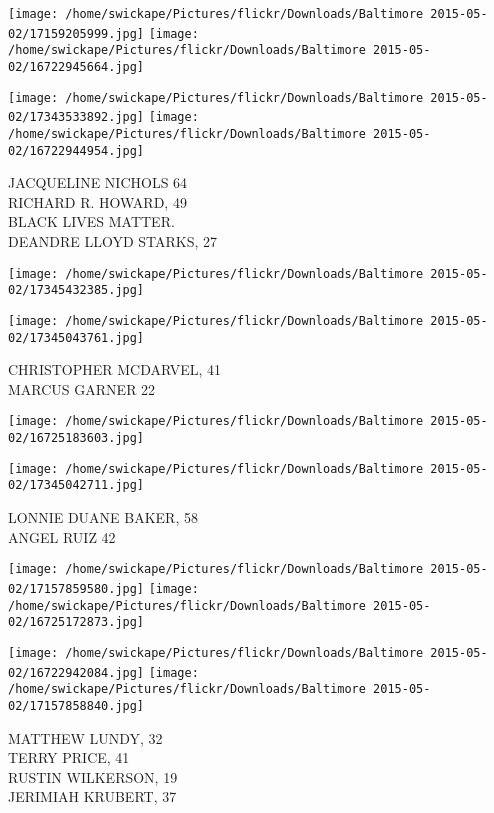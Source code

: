 \documentclass[10pt,letterpaper]{article}
\begin{document}
\texttt{[image: /home/swickape/Pictures/flickr/Downloads/Baltimore 2015-05-02/17159205999.jpg]}
\texttt{[image: /home/swickape/Pictures/flickr/Downloads/Baltimore 2015-05-02/16722945664.jpg]}

\texttt{[image: /home/swickape/Pictures/flickr/Downloads/Baltimore 2015-05-02/17343533892.jpg]}
\texttt{[image: /home/swickape/Pictures/flickr/Downloads/Baltimore 2015-05-02/16722944954.jpg]}

JACQUELINE NICHOLS 64\\
RICHARD R. HOWARD, 49\\
BLACK LIVES MATTER.\\
DEANDRE LLOYD STARKS, 27\\
\pagebreak

\texttt{[image: /home/swickape/Pictures/flickr/Downloads/Baltimore 2015-05-02/17345432385.jpg]}

\vspace{0.25in}
\texttt{[image: /home/swickape/Pictures/flickr/Downloads/Baltimore 2015-05-02/17345043761.jpg]}

CHRISTOPHER MCDARVEL, 41\\
MARCUS GARNER 22\\
\pagebreak

\texttt{[image: /home/swickape/Pictures/flickr/Downloads/Baltimore 2015-05-02/16725183603.jpg]}

\vspace{0.25in}
\texttt{[image: /home/swickape/Pictures/flickr/Downloads/Baltimore 2015-05-02/17345042711.jpg]}

LONNIE DUANE BAKER, 58\\
ANGEL RUIZ 42\\
\pagebreak

\texttt{[image: /home/swickape/Pictures/flickr/Downloads/Baltimore 2015-05-02/17157859580.jpg]}
\texttt{[image: /home/swickape/Pictures/flickr/Downloads/Baltimore 2015-05-02/16725172873.jpg]}

\texttt{[image: /home/swickape/Pictures/flickr/Downloads/Baltimore 2015-05-02/16722942084.jpg]}
\texttt{[image: /home/swickape/Pictures/flickr/Downloads/Baltimore 2015-05-02/17157858840.jpg]}

MATTHEW LUNDY, 32\\
TERRY PRICE, 41\\
RUSTIN WILKERSON, 19\\
JERIMIAH KRUBERT, 37\\
\pagebreak
\end{document}
